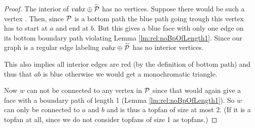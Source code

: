 \begin{proof}
      The interior of  $vabx \oplus \rev \P$ has no vertices. Suppose there would be such a vertex . Then, since $\P$ is a bottom path the blue path going trough this vertex has to start at $a$ and end at $b$. But this gives a blue face with only one edge on its bottom boundary path violating Lemma \ref{lm:rel:noBpOfLength1}. Since our graph is a regular edge labeling $vabx \oplus \rev \P$ has no interior vertices.

      This also implies all interior edges are red (by the definition of bottom path) and thus that $ab$ is blue otherwise we would get a monochromatic triangle.

      Now $w$ can not be connected to any vertex in $\P$ since that would again give a face with a boundary path of length 1 (Lemma \ref{lm:rel:noBpOfLength1}).
      So $w$ can only be connected to $a$ and $b$ and is thus a topfan of size at most $2$.
      (If it is a topfan at all, since we do not consider topfans of size 1 as topfans.)
    \end{proof}
